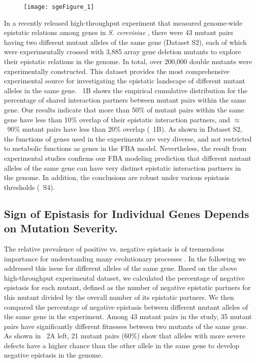 \begin{figure}[H]
\centering
\texttt{[image: sgeFigure\_1]}
\end{figure}

In a recently released high-throughput experiment that measured
genome-wide epistatic relations among genes in \textit{S. cerevisiae} \citep{Costanzo2010},
there were 43 mutant pairs having two different mutant alleles of the
same gene (Dataset S2), each of which were experimentally crossed with
3,885 array gene deletion mutants to explore their epistatic relations
in the genome. In total, over 200,000 double mutants were
experimentally constructed. This dataset provides the most
comprehensive experimental source for investigating the epistatic
landscape of different mutant alleles in the same gene. \Fig~1B shows
the empirical cumulative distribution for the percentage of shared
interaction partners between mutant pairs within the same gene. Our
results indicate that more than 50\% of mutant pairs within the same
gene have less than 10\% overlap of their epistatic interaction
partners, and $\approx$~90\% mutant pairs have less than 20\% overlap
(\Fig~1B). As shown in Dataset S2, the functions of genes used in the
experiments are very diverse, and not restricted to metabolic
functions as genes in the FBA model. Nevertheless, the result from
experimental studies confirms our FBA modeling prediction that
different mutant alleles of the same gene can have very distinct
epistatic interaction partners in the genome. In addition, the
conclusions are robust under various epistasis thresholds (\Fig~S4).

\subsection{Sign of Epistasis for Individual Genes Depends on Mutation
Severity.}

The relative prevalence of positive vs. negative epistasis is of
tremendous importance for understanding many evolutionary processes
\citep{Phillips2008, Boone2007, Kimura1966}. 
In the following we addressed this issue for different alleles
of the same gene. Based on the above high-throughput experimental
dataset, we calculated the percentage of negative epistasis for each
mutant, defined as the number of negative epistatic partners for this
mutant divided by the overall number of its epistatic partners. We
then compared the percentage of negative epistasis between different
mutant alleles of the same gene in the experiment. Among 43 mutant
pairs in the study, 35 mutant pairs have significantly different
fitnesses between two mutants of the same gene. As shown in \Fig~2A
left, 21 mutant pairs (60\%) show that alleles with more severe
defects have a higher chance than the other allele in the same gene to
develop negative epistasis in the genome.



